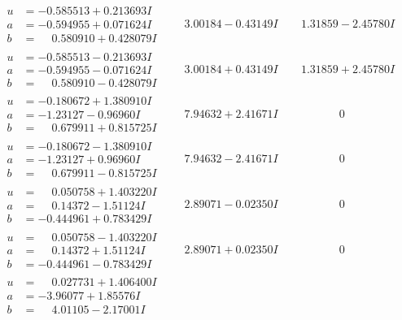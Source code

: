 \documentclass[1p]{elsarticle_modified}
\theoremstyle{definition}
\begin{document}
$$\begin{array}{c|c|c}
\begin{aligned}
u &= -0.585513 + 0.213693 I \\
a &= -0.594955 + 0.071624 I \\
b &= \phantom{-}0.580910 + 0.428079 I\end{aligned}
 & \phantom{-}3.00184 - 0.43149 I & \phantom{-}1.31859 - 2.45780 I \\ \hline\begin{aligned}
u &= -0.585513 - 0.213693 I \\
a &= -0.594955 - 0.071624 I \\
b &= \phantom{-}0.580910 - 0.428079 I\end{aligned}
 & \phantom{-}3.00184 + 0.43149 I & \phantom{-}1.31859 + 2.45780 I \\ \hline\begin{aligned}
u &= -0.180672 + 1.380910 I \\
a &= -1.23127 - 0.96960 I \\
b &= \phantom{-}0.679911 + 0.815725 I\end{aligned}
 & \phantom{-}7.94632 + 2.41671 I & \phantom{-0.000000 } 0 \\ \hline\begin{aligned}
u &= -0.180672 - 1.380910 I \\
a &= -1.23127 + 0.96960 I \\
b &= \phantom{-}0.679911 - 0.815725 I\end{aligned}
 & \phantom{-}7.94632 - 2.41671 I & \phantom{-0.000000 } 0 \\ \hline\begin{aligned}
u &= \phantom{-}0.050758 + 1.403220 I \\
a &= \phantom{-}0.14372 - 1.51124 I \\
b &= -0.444961 + 0.783429 I\end{aligned}
 & \phantom{-}2.89071 - 0.02350 I & \phantom{-0.000000 } 0 \\ \hline\begin{aligned}
u &= \phantom{-}0.050758 - 1.403220 I \\
a &= \phantom{-}0.14372 + 1.51124 I \\
b &= -0.444961 - 0.783429 I\end{aligned}
 & \phantom{-}2.89071 + 0.02350 I & \phantom{-0.000000 } 0 \\ \hline\begin{aligned}
u &= \phantom{-}0.027731 + 1.406400 I \\
a &= -3.96077 + 1.85576 I \\
b &= \phantom{-}4.01105 - 2.17001 I\end{aligned}

\end{array}$$
\end{document}
